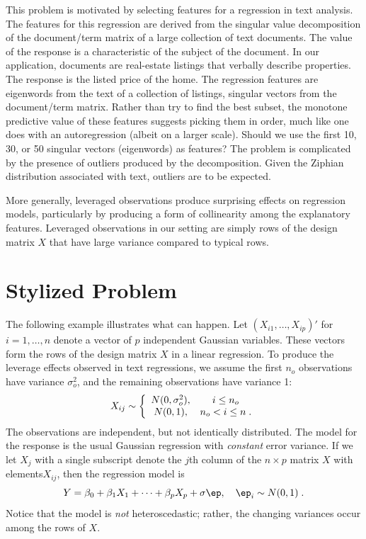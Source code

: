 \documentclass[12pt]{article}
\begin{document}
 This problem is motivated by selecting features for a regression in text
 analysis.  The features for this regression are derived from the singular value
 decomposition of the document/term matrix of a large collection of text
 documents.  The value of the response is a characteristic of the subject of the
 document.  In our application, documents are real-estate listings that verbally
 describe properties.  The response is the listed price of the home.  The
 regression features are eigenwords from the text of a collection of listings,
 singular vectors from the document/term matrix.  Rather than try to find the
 best subset, the monotone predictive value of these features suggests picking
 them in order, much like one does with an autoregression (albeit on a larger
 scale).  Should we use the first 10, 30, or 50 singular vectors (eigenwords) as
 features?  The problem is complicated by the presence of outliers produced by
 the decomposition.  Given the Ziphian distribution associated with text,
 outliers are to be expected.


 More generally, leveraged observations produce surprising effects on regression
 models, particularly by producing a form of collinearity among the explanatory
 features.  Leveraged observations in our setting are simply rows of the design
 matrix $X$ that have large variance compared to typical rows.


\section{ Stylized Problem }
\label{sec:problem}

 The following example illustrates what can happen.  Let $(X_{i1}, \ldots,
 X_{ip})'$ for $i = 1,\ldots,n$ denote a vector of $p$ independent Gaussian
 variables.  These vectors form the rows of the design matrix $X$ in a linear
 regression.  To produce the leverage effects observed in text regressions, we
 assume the first $n_o$ observations have variance $\sigma_o^2$, and the
 remaining observations have variance 1:
 \begin{equation}
    X_{ij} \sim \left\{ \begin{array}{cc}
              N(0,\sigma_o^2), & i \le n_o \cr
              N(0,1)    , & n_o < i \le n \;.
   \end{array} \right.
 \label{eq:Xij}
 \end{equation}
 The observations are independent, but not identically distributed.  The model
 for the response is the usual Gaussian regression with {\em constant} error
 variance.  If we let $X_j$ with a single subscript denote the $j$th column of
the $n \times p$ matrix $X$ with elements$X_{ij}$, then the regression model is
 \begin{equation}
   Y = \beta_0 + \beta_1 X_{1} + \cdots + \beta_p X_{p} + \sigma \ep,
        \quad \ep_i \sim N(0,1) \;.   
 \label{eq:Yi}
 \end{equation}
 Notice that the model is {\em not} heteroscedastic; rather, the changing
 variances occur among the rows of $X$.
\end{document}
